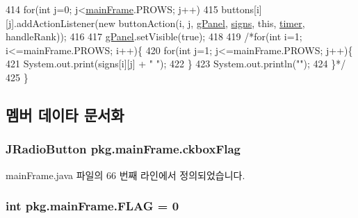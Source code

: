 \begin{DoxyCode}
414             \textcolor{keywordflow}{for}(\textcolor{keywordtype}{int} j=0; j<\hyperlink{classpkg_1_1main_frame_a0edb10d75697656c940f3b5e3ba7d9ef}{mainFrame}.PROWS; j++)
415                 buttons[i][j].addActionListener(\textcolor{keyword}{new} buttonAction(i, j, \hyperlink{classpkg_1_1main_frame_a17ea45ba089445a24b9da9bf561f6603}{gPanel}, 
      \hyperlink{classpkg_1_1main_frame_ae3c9f6e7ee48c1661dc3fe814fd67554}{signs}, \textcolor{keyword}{this}, \hyperlink{classpkg_1_1main_frame_aa204a940456c1c064259cafdd59434a6}{timer}, handleRank));
416         
417         \hyperlink{classpkg_1_1main_frame_a17ea45ba089445a24b9da9bf561f6603}{gPanel}.setVisible(\textcolor{keyword}{true});
418         
419         \textcolor{comment}{/*for(int i=1; i<=mainFrame.PROWS; i++)\{}
420 \textcolor{comment}{            for(int j=1; j<=mainFrame.PROWS; j++)\{}
421 \textcolor{comment}{                System.out.print(signs[i][j] + " ");}
422 \textcolor{comment}{            \}}
423 \textcolor{comment}{            System.out.println("");}
424 \textcolor{comment}{        \}*/}
425     \}
\end{DoxyCode}


\subsection{멤버 데이타 문서화}
\subsubsection[{\texorpdfstring{ckbox\+Flag}{ckboxFlag}}]{\setlength{\rightskip}{0pt plus 5cm}J\+Radio\+Button pkg.\+main\+Frame.\+ckbox\+Flag\hspace{0.3cm}{\ttfamily [private]}}\hypertarget{classpkg_1_1main_frame_aa5f83e91dbc66938adbeb69d07446101}{}\label{classpkg_1_1main_frame_aa5f83e91dbc66938adbeb69d07446101}


main\+Frame.\+java 파일의 66 번째 라인에서 정의되었습니다.

\subsubsection[{\texorpdfstring{F\+L\+AG}{FLAG}}]{\setlength{\rightskip}{0pt plus 5cm}int pkg.\+main\+Frame.\+F\+L\+AG = 0\hspace{0.3cm}{\ttfamily [static]}}\hypertarget{classpkg_1_1main_frame_a505e81ce8df404341832e27fcb88e1de}{}\label{classpkg_1_1main_frame_a505e81ce8df404341832e27fcb88e1de}


